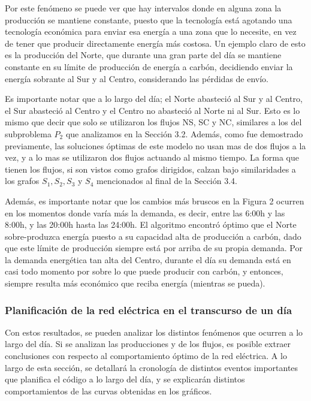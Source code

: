 \documentclass[12pt,twoside]{article}
\begin{document}
	\hspace{1cm} Por este fen\'omeno se puede ver que hay intervalos donde en alguna zona la producci\'on se mantiene constante, puesto que la tecnolog\'ia est\'a agotando una tecnolog\'ia econ\'omica para enviar esa energ\'ia a una zona que lo necesite, en vez de tener que producir directamente energ\'ia m\'as costosa. Un ejemplo claro de esto es la producci\'on del Norte, que durante una gran parte del d\'ia se mantiene constante en su l\'imite de producci\'on de energ\'ia a carb\'on, decidiendo enviar la energ\'ia sobrante al Sur y al Centro, considerando las p\'erdidas de env\'io.
	
	\hspace{1cm} Es importante notar que a lo largo del d\'ia; el Norte abasteci\'o al Sur y al Centro, el Sur abasteci\'o al Centro y el Centro no abasteci\'o al Norte ni al Sur. Esto es lo mismo que decir que solo se utilizaron los flujos NS, SC y NC, similares a los del subproblema \(P_2\) que analizamos en la Secci\'on 3.2. Adem\'as, como fue demostrado previamente, las soluciones \'optimas de este modelo no usan mas de dos flujos a la vez, y a lo mas se utilizaron dos flujos actuando al mismo tiempo. La forma que tienen los flujos, si son vistos como grafos dirigidos, calzan bajo similaridades a los grafos \(S_1, S_2, S_3\) y \(S_4\) mencionados al final de la Secci\'on 3.4.
	
	\hspace{1cm} Adem\'as, es importante notar que los cambios m\'as bruscos en la Figura 2 ocurren en los momentos donde var\'ia m\'as la demanda, es decir, entre las 6:00h y las 8:00h, y las 20:00h hasta las 24:00h. El algoritmo encontr\'o \'optimo que el Norte sobre-produzca energ\'ia puesto a su capacidad alta de producci\'on a carb\'on, dado que este l\'imite de producci\'on siempre est\'a por arriba de su propia demanda. Por la demanda energ\'etica tan alta del Centro, durante el d\'ia su demanda est\'a en casi todo momento por sobre lo que puede producir con carb\'on, y entonces, siempre resulta m\'as econ\'omico que reciba energ\'ia (mientras se pueda).
	
	\subsubsection{Planificaci\'on de la red el\'ectrica en el transcurso de un d\'ia}
	\hspace{1cm} Con estos resultados, se pueden analizar los distintos fen\'omenos que ocurren a lo largo del d\'ia. Si se analizan las producciones y de los flujos, es posible extraer conclusiones con respecto al comportamiento \'optimo de la red el\'ectrica. A lo largo de esta secci\'on, se detallar\'a la cronolog\'ia de distintos eventos importantes que planifica el c\'odigo a lo largo del d\'ia, y se explicar\'an distintos comportamientos de las curvas obtenidas en los gr\'aficos.
	
\end{document}
